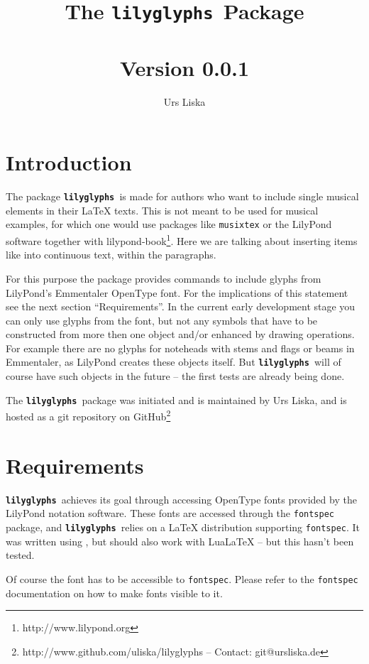 \documentclass{article}
\newcommand{\lilyglyphs}{\texttt{\textbf{lilyglyphs\,}}}
\begin{document}
\title{The \lilyglyphs Package\\~\\
	\normalsize Version 0.0.1}
\author{Urs Liska}

\maketitle
\tableofcontents


\section{Introduction}
The package \lilyglyphs is made for authors who want to include single musical elements in their \LaTeX{} texts. This is not meant to be used for musical examples, for which one would use packages like \texttt{musixtex} or the LilyPond software together with lilypond-book\footnote{http://www.lilypond.org}. Here we are talking about inserting items like \lilyRFZ* into continuous text, within the paragraphs.

For this purpose the package provides commands to include glyphs from LilyPond's Emmentaler OpenType font. For the implications of this statement see the next section \enquote{Requirements}. In the current early development stage you can only use glyphs from the font, but not any symbols that have to be constructed from more then one object and/or enhanced by drawing operations. For example there are no glyphs for noteheads with stems and flags or beams in Emmentaler, as LilyPond creates these objects itself. But \lilyglyphs will of course have such objects in the future -- the first tests are already being done.

The \lilyglyphs package was initiated and is maintained by Urs Liska, and is hosted as a git repository on GitHub\footnote{http://www.github.com/uliska/lilyglyphs -- Contact: git@ursliska.de}

\section{Requirements}
\lilyglyphs achieves its goal through accessing OpenType fonts provided by the LilyPond notation software. These fonts are accessed through the \texttt{fontspec} package, and \lilyglyphs relies on a \LaTeX{} distribution supporting \texttt{fontspec}. It was written using \XeLaTeX, but should also work with LuaLaTeX -- but this hasn't been tested.

Of course the font has to be accessible to \texttt{fontspec}. Please refer to the \texttt{fontspec} documentation on how to make fonts visible to it. 
\end{document}
